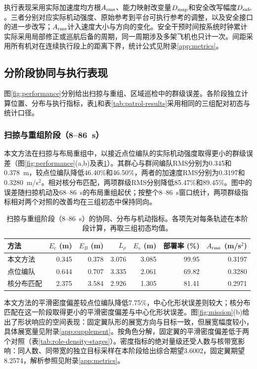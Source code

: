 \documentclass[UTF8,a4paper,11pt,fontset=none]{ctexart}
\begin{document}
执行表现采用实际加速度均方根$A_{\rm rms}$、能力映射改变量$D_{\rm map}$和安全改写幅度$D_{\rm safe}$。三者分别对应实际机动强度、原始参考到平台可执行参考的调整，以及安全接口的进一步改写；$A_{\rm rms}$计入速度大小与方向的变化\cite{luis2019}。安全干预时间按系统时钟累计实际采用局部修正或巡航后备的周期，同一周期涉及多架飞机也只计一次。间距采用所有机对在连续执行段上的距离下界，统计公式见附录\ref{app:metrics}。

\subsection{分阶段协同与执行表现}
图\ref{fig:performance}分别给出扫掠与重组、区域巡检中的群级误差。各阶段独立计算位置、分布与执行指标，表\ref{tab:sweep-results}和表\ref{tab:patrol-results}采用相同的三组配对初态与统计口径。

\subsubsection{扫掠与重组阶段（8--86~s）}
本文方法在扫掠与布局重组中，以接近点位编队的实际机动强度取得更小的群级误差（图\ref{fig:performance}(a,b)及表\ref{tab:sweep-results}）。其群心与群间编队RMS分别为0.345和0.378~m，较点位编队降低46.40\%和46.50\%，两者的加速度RMS分别为0.3197和0.3280~m/s$^2$。相对核分布匹配，两项群级RMS分别降低85.47\%和89.45\%。图中的误差随扫掠机动及68--86~s的布局重组起伏；按整个8--86~s窗口统计，两项群级指标相对两个对照的改善均在三组初态中保持同向。

\begin{table}[htbp]\centering\small
\caption{扫掠与重组阶段（8--86~s）的协同、分布与机动指标。各项先对每条轨迹在本阶段计算，再取三组初态均值。}\label{tab:sweep-results}
\setlength{\tabcolsep}{4pt}
\begin{tabular}{lrrrrrr}\toprule
方法 & $E_c$ (m) & $E_B$ (m) & $L_\rho$ & $E_s$ (m) & 部署率 (\%) & $A_{\rm rms}$ (m/s$^2$)\\\midrule
本文方法 & 0.345 & 0.378 & 3.076 & 3.085 & 99.95 & 0.3197\\
点位编队 & 0.644 & 0.707 & 3.335 & 2.061 & 69.82 & 0.3280\\
核分布匹配 & 2.375 & 3.584 & 2.926 & 1.305 & 81.41 & 0.2971\\\bottomrule
\end{tabular}\end{table}

本文方法的平滑密度偏差较点位编队降低7.75\%，中心化形状误差则较大；核分布匹配在这一阶段取得更小的平滑密度偏差与中心化形状误差。图\ref{fig:mission}(b)给出了形状响应的空间表现：固定翼队形的展宽方向与目标一致，但展宽幅度较小，具体展宽量见附录\ref{app:supplement}。按角色分解，固定翼的平滑密度偏差低于两个对照（表\ref{tab:role-density-stages}）。密度指标的绝对量级还受人数与核带宽影响：同人数、同带宽的独立目标采样在本阶段给出综合期望3.6002，固定翼期望8.2574，解析参照见附录\ref{app:metrics}。
\end{document}
